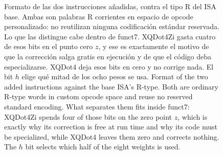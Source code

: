 \begin{figure}[!htbp]
\caption{\ifSpanish Formato de las dos instrucciones añadidas, contra el tipo R
del ISA base. Ambas son palabras R corrientes en espacio de opcode
personalizado: no reutilizan ninguna codificación estándar reservada. Lo que las
distingue cabe dentro de funct7. XQDot4Zi gasta cuatro de esos bits en el punto
cero $z$, y ese es exactamente el motivo de que la corrección salga gratis en
ejecución y de que el código deba especializarse. XQDot4 deja esos bits en cero
y no corrige nada. El bit $h$ elige qué mitad de los ocho pesos se usa.
\else Format of the two added instructions against the base ISA's R-type. Both
are ordinary R-type words in custom opcode space and reuse no reserved standard
encoding. What separates them fits inside funct7: XQDot4Zi spends four of those
bits on the zero point $z$, which is exactly why its correction is free at run
time and why its code must be specialized, while XQDot4 leaves them zero and
corrects nothing. The $h$ bit selects which half of the eight weights is
used.\fi}
\label{fig:encoding}
\end{figure}
